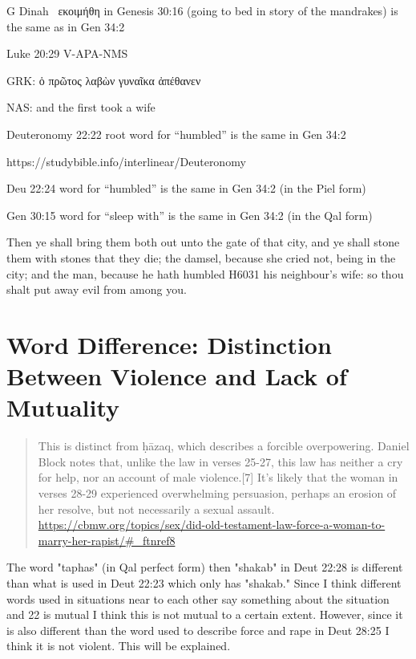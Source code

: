 \documentclass[11pt]{article}
\begin{document}

G Dinah 
  εκοιμήθη in Genesis 30:16 (going to bed in story of the mandrakes) is the same as in Gen 34:2 


Luke 20:29 V-APA-NMS
\begin{greek}
GRK: ὁ πρῶτος λαβὼν γυναῖκα ἀπέθανεν
\end{greek}
NAS: and the first took a wife


Deuteronomy 22:22 root word for “humbled” is the same in Gen 34:2

 https://studybible.info/interlinear/Deuteronomy%



 Deu 22:24 word for “humbled” is the same in Gen 34:2 (in the Piel form)


Gen 30:15 word for “sleep with” is the same in Gen 34:2 (in the Qal form)

Then ye shall bring them both out unto the gate of that city, and ye shall stone them with stones that they die; the damsel, because she cried not, being in the city; and the man, because he hath humbled H6031 his neighbour's wife: so thou shalt put away evil from among you.




\section{Word Difference: Distinction Between Violence and Lack of Mutuality}
\begin{quote}
This is distinct from ḥāzaq, which describes a forcible overpowering. Daniel Block notes that, unlike the law in verses 25-27, this law has neither a cry for help, nor an account of male violence.[7] It’s likely that the woman in verses 28-29 experienced overwhelming persuasion, perhaps an erosion of her resolve, but not necessarily a sexual assault.
\url{https://cbmw.org/topics/sex/did-old-testament-law-force-a-woman-to-marry-her-rapist/#_ftnref8}
\end{quote}
The word "taphas" (in Qal perfect form) then "shakab" in Deut 22:28 is different than what is used in Deut 22:23 which only has "shakab." Since I think different words used in situations near to each other say something about the situation and 22 is mutual I think this is not mutual to a certain extent. However, since it is also different than the word used to describe force and rape in Deut 28:25 I think it is not violent. This will be explained. 
\end{document}

